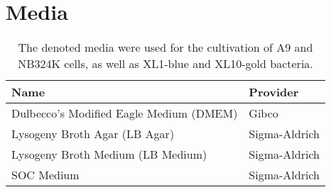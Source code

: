 


\section{Media} 
\bigskip
\begin{center}
\begin{table}[H]
\begin{center}
\caption[Media]{The denoted media were used for the cultivation of A9 and NB324K cells, as well as XL1-blue and XL10-gold bacteria.}
\vspace{.5cm}
\hspace{1.4cm}\begin{tabular}{l l}
\hline
\label{Media}
\textbf{Name} & \textbf{Provider}\Tstrut\Bstrut\\
\hline
Dulbecco's Modified Eagle Medium (DMEM) & Gibco\\
Lysogeny Broth Agar (LB Agar) & Sigma-Aldrich\\
Lysogeny Broth Medium (LB Medium) & Sigma-Aldrich\\
SOC Medium & Sigma-Aldrich\\[1.1ex]
\hline
\end{tabular}
\end{center}
\end{table}
\end{center}